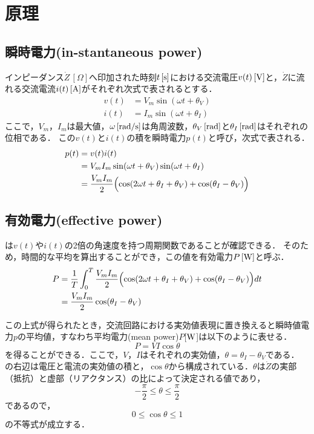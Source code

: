 \clearpage

\section{原理}
\subsection{瞬時電力(in-stantaneous power)\cite{11300007922816}\cite{1130282271973066112}}
インピーダンス$\dot{Z}\,[\Omega]$へ印加された時刻$t\,[\rm{s}]$における交流電圧$v(t)\,[\rm{V}]$と，$\dot{Z}$に流れる交流電流$i(t)\,[\rm{A}]$がそれぞれ次式で表されるとする．
\begin{align}
	v(t) &= V_m\sin(\omega t+\theta_V)\\
	i(t) &= I_m\sin(\omega t + \theta_I)
\end{align}
ここで，$V_m$，$I_m$は最大値，$\omega\,[\rm{rad/s}]$は角周波数，$\theta_V\,[\rm{rad}]$と$\theta_I\,[\rm{rad}]$はそれぞれの位相である．
この$v(t)$と$i(t)$の積を瞬時電力$p(t)$と呼び，次式で表される．
\begin{align}
	p(t)&= v(t)i(t)\nonumber\\
	&=V_mI_m\sin(\omega t+\theta_V)\sin(\omega t + \theta_I)\nonumber\\
	&= \frac{V_mI_m}{2}\Bigl(\cos(2\omega t + \theta_I+\theta_V)+\cos(\theta_I - \theta_V)\Bigr)
	\label{eq:ip}
\end{align}

\subsection{有効電力(effective power)\cite{11300007922816}\cite{113028223066112}}
は$v(t)$や$i(t)$の2倍の角速度を持つ周期関数であることが確認できる．
そのため，時間的な平均を算出することができ，この値を有効電力$P\,[\rm{W}]$と呼ぶ．
\begin{align}
	P &=\frac{1}{T}\int_0^T \frac{V_mI_m}{2}\Bigl(\cos(2\omega t + \theta_I+\theta_V)+\cos(\theta_I - \theta_V)\Bigr) dt\nonumber\\
	&=\frac{V_mI_m}{2}\cos(\theta_I - \theta_V)
\end{align}

この上式が得られたとき，交流回路における実効値表現に置き換えると瞬時値電力$p$の平均値，すなわち平均電力(mean power)$P$[$\rm{W}$]は以下のように表せる．
\begin{equation}
	P = VI\cos\theta
	\label{eq:power}
\end{equation}
を得ることができる．ここで，$V$，$I$はそれぞれの実効値，$\theta=\theta_I-\theta_V$である．
の右辺は電圧と電流の実効値の積と，$\cos\theta$から構成されている．$\theta$は$\dot{Z}$の実部（抵抗）と虚部（リアクタンス）の比によって決定される値であり，
\begin{equation}
	-\frac{\pi}{2}\leq\theta\leq\frac{\pi}{2}
\end{equation}
であるので，
\begin{equation}
	0\leq\cos\theta\leq 1
	\label{eq:angle}
\end{equation}
の不等式が成立する．


